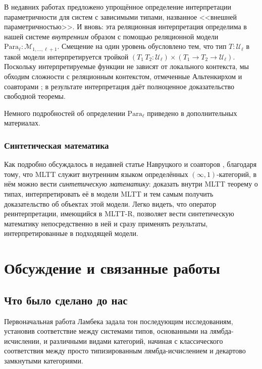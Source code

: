 В недавних работах \cite{Bernardy:Parametricity2010,
Altenkirch:Parametricity2024} предложено упрощённое
определение интерпретации параметричности для систем с
зависимыми типами, названное <<внешней
параметричностью>>. И вновь: эта реляционная
интерпретация определима в нашей системе
\emph{внутренним} образом с помощью реляционной модели
$\mathrm{Para}_\ell:\mathcal{M}_{1,\ldots,\ell+1}$.
Смещение на один уровень обусловлено тем, что тип
$T:\mathcal{U}_\ell$ в такой модели интерпретируется
тройкой $(T_1\,T_2:\mathcal{U}_\ell)\times
(T_1\to T_2\to\mathcal{U}_\ell)$. Поскольку
интерпретируемые функции не зависят от локального
контекста, мы обходим сложности с реляционным
контекстом, отмеченные Альтенкирхом и соавторами
\cite{Altenkirch:Parametricity2024}; в результате
интерпретация даёт полноценное доказательство свободной
теоремы.

Немного подробностей об определении
$\mathrm{Para}_\ell$ приведено в дополнительных
материалах.

\subsubsection{Синтетическая математика}
\label{MLTT-R-synthetic}

Как подробно обсуждалось в недавней статье Навруцкого и
соавторов \cite{Nawrocki:Lean2026}, благодаря тому, что
MLTT служит внутренним языком определённых
$(\infty,1)$-категорий, в нём можно вести
\emph{синтетическую математику}: доказать внутри MLTT
теорему о типах, интерпретировать её в модели MLTT и
тем самым получить доказательство об объектах этой
модели. Легко видеть, что оператор реинтерпретации,
имеющийся в MLTT-R, позволяет вести синтетическую
математику непосредственно в ней и сразу применять
результаты, интерпретированные в подходящей модели.

\section{Обсуждение и связанные работы}

\subsection{Что было сделано до нас}

Первоначальная работа Ламбека \cite{Lambek1980} задала
тон последующим исследованиям, установив соответствие
между системами типов, основанными на
лямбда-исчислении, и различными видами категорий,
начиная с классического соответствия между просто
типизированным лямбда-исчислением и декартово
замкнутыми категориями.

